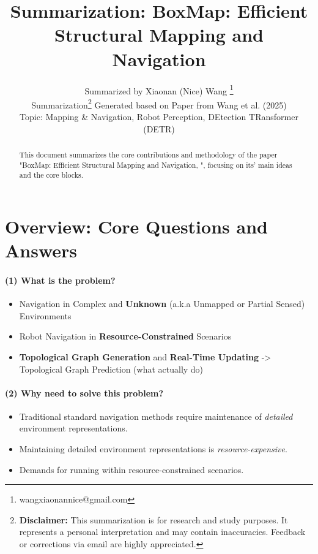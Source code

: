 \documentclass{article}
\title{Summarization: BoxMap: Efficient Structural Mapping and Navigation}
\author{
  Summarized by Xiaonan (Nice) Wang \thanks{wangxiaonannice@gmail.com} \\
  Summarization\thanks{\textbf{Disclaimer:} This summarization is for research and study purposes. It represents a personal interpretation and may contain inaccuracies. Feedback or corrections via email are highly appreciated.} Generated based on Paper from Wang et al. (2025) \\
  Topic: Mapping \& Navigation, Robot Perception, DEtection TRansformer (DETR) \\
}
\begin{document}
\maketitle

\begin{abstract}
This document summarizes the core contributions and methodology of the paper "BoxMap: Efficient Structural Mapping and Navigation, \cite{wang2025boxmap}", focusing on its' main ideas and the core blocks.
\end{abstract}

\section{Overview: Core Questions and Answers}

\paragraph{(1) What is the problem?} 
\begin{itemize}
  \item Navigation in Complex and \textbf{Unknown} (a.k.a Unmapped or Partial Sensed) Environments
  \item Robot Navigation in \textbf{Resource-Constrained} Scenarios
  \item \textbf{Topological Graph Generation} and \textbf{Real-Time Updating} -> Topological Graph Prediction (what actually do)
\end{itemize}

\paragraph{(2) Why need to solve this problem?}
\begin{itemize}
  \item Traditional standard navigation methods require maintenance of \textit{detailed} environment representations.
  \item Maintaining detailed environment representations is \textit{resource-expensive}.
  \item Demands for running within resource-constrained scenarios.
\end{itemize}
\end{document}
